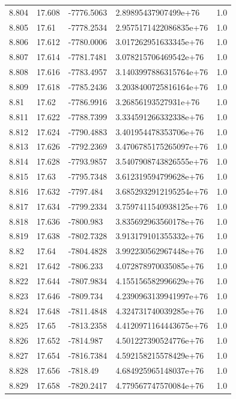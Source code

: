 \begin{tabular}{lllll}
8.804 & 17.608 & -7776.5063 & 2.89895437907499e+76 & 1.0 \\
8.805 & 17.61 & -7778.2534 & 2.9575171422086835e+76 & 1.0 \\
8.806 & 17.612 & -7780.0006 & 3.017262951633345e+76 & 1.0 \\
8.807 & 17.614 & -7781.7481 & 3.078215706469542e+76 & 1.0 \\
8.808 & 17.616 & -7783.4957 & 3.1403997886315764e+76 & 1.0 \\
8.809 & 17.618 & -7785.2436 & 3.2038400725816164e+76 & 1.0 \\
8.81 & 17.62 & -7786.9916 & 3.26856193527931e+76 & 1.0 \\
8.811 & 17.622 & -7788.7399 & 3.334591266332338e+76 & 1.0 \\
8.812 & 17.624 & -7790.4883 & 3.401954478353706e+76 & 1.0 \\
8.813 & 17.626 & -7792.2369 & 3.4706785175265097e+76 & 1.0 \\
8.814 & 17.628 & -7793.9857 & 3.5407908743826555e+76 & 1.0 \\
8.815 & 17.63 & -7795.7348 & 3.612319594799628e+76 & 1.0 \\
8.816 & 17.632 & -7797.484 & 3.6852932912195254e+76 & 1.0 \\
8.817 & 17.634 & -7799.2334 & 3.7597411540938125e+76 & 1.0 \\
8.818 & 17.636 & -7800.983 & 3.835692963560178e+76 & 1.0 \\
8.819 & 17.638 & -7802.7328 & 3.913179101355332e+76 & 1.0 \\
8.82 & 17.64 & -7804.4828 & 3.992230562967448e+76 & 1.0 \\
8.821 & 17.642 & -7806.233 & 4.072878970035085e+76 & 1.0 \\
8.822 & 17.644 & -7807.9834 & 4.155156582996629e+76 & 1.0 \\
8.823 & 17.646 & -7809.734 & 4.2390963139941997e+76 & 1.0 \\
8.824 & 17.648 & -7811.4848 & 4.324731740039285e+76 & 1.0 \\
8.825 & 17.65 & -7813.2358 & 4.4120971164443675e+76 & 1.0 \\
8.826 & 17.652 & -7814.987 & 4.501227390524776e+76 & 1.0 \\
8.827 & 17.654 & -7816.7384 & 4.592158215578429e+76 & 1.0 \\
8.828 & 17.656 & -7818.49 & 4.684925965148037e+76 & 1.0 \\
8.829 & 17.658 & -7820.2417 & 4.779567747570084e+76 & 1.0 \\

\end{tabular}
